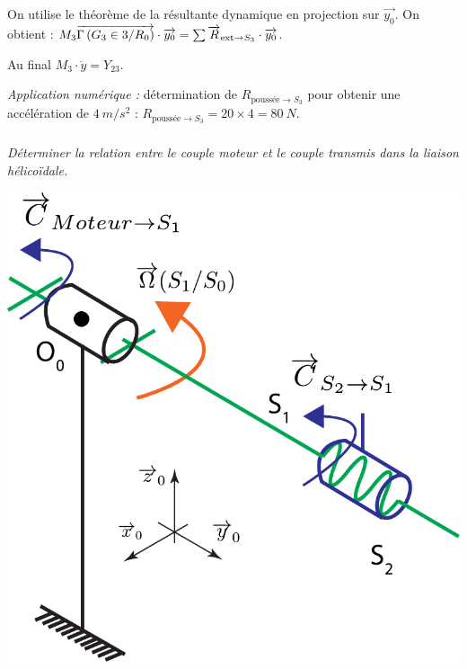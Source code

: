 \documentclass[10pt,fleqn]{article} %
\begin{document}
\begin{multicols}{2}
\begin{multicols}{2}
\begin{corrige}
On utilise le théorème de la résultante dynamique en projection sur $\overrightarrow{y_0}$. On obtient : $
M_3 \overrightarrow{\Gamma \left( {G_3} \in {3}/{R_0}\right)}\cdot \overrightarrow{y_0}=\sum \overrightarrow{R}_{\text{ext}\to S_3}\cdot \overrightarrow{y_0}$.
 
Au final $M_3\cdot \ddot{y}=Y_{23}$.


\textit{Application numérique : } détermination de $R_{\text{pouss\'ee}\to S_3}$ pour obtenir une accélération de $\SI{4}{m/s^2}$ : $R_{\text{pouss\'ee}\to S_3}=20\times 4=\SI{80}{N}
$.
\end{corrige}
\else
\fi


\subparagraph{}
\textit{Déterminer la relation entre le couple moteur et le couple transmis dans la liaison hélicoïdale.}


\ifprof
\begin{corrige}
\begin{center}
\includegraphics[width=.8\linewidth]{images/schema_cine_depose_rotation.pdf}
\end{center}


\end{corrige}
\end{multicols}
\end{multicols}
\end{document}
